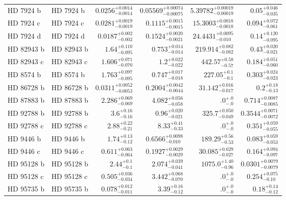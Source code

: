 \begin{longtable*}{llrrrr}
HD 7924 b & HD 7924 b & $0.0256^{+0.0014}_{-0.0014}$ & $0.05569^{+0.00074}_{-0.00075}$ & $5.39782^{+0.00019}_{-0.00019}$ & $0.05^{+0.046}_{-0.035}$ \\ 
HD 7924 c & HD 7924 c & $0.0281^{+0.0019}_{-0.0019}$ & $0.1115^{+0.0015}_{-0.0015}$ & $15.3003^{+0.0018}_{-0.0018}$ & $0.094^{+0.072}_{-0.061}$ \\ 
HD 7924 d & HD 7924 d & $0.0187^{+0.002}_{-0.002}$ & $0.1524^{+0.0020}_{-0.0021}$ & $24.4431^{+0.0095}_{-0.010}$ & $0.14^{+0.120}_{-0.095}$ \\ 
HD 82943 b & HD 82943 b & $1.64^{+0.110}_{-0.095}$ & $0.753^{+0.014}_{-0.014}$ & $219.914^{+0.082}_{-0.082}$ & $0.43^{+0.020}_{-0.021}$ \\ 
HD 82943 c & HD 82943 c & $1.606^{+0.071}_{-0.070}$ & $1.2^{+0.022}_{-0.022}$ & $442.57^{+0.58}_{-0.57}$ & $0.184^{+0.051}_{-0.060}$ \\ 
HD 8574 b & HD 8574 b & $1.763^{+0.097}_{-0.095}$ & $0.747^{+0.017}_{-0.018}$ & $227.05^{+0.1}_{-0.1}$ & $0.303^{+0.024}_{-0.023}$ \\ 
HD 86728 b & HD 86728 b & $0.0311^{+0.0052}_{-0.0053}$ & $0.2004^{+0.0042}_{-0.0044}$ & $31.142^{+0.016}_{-0.017}$ & $0.2^{+0.18}_{-0.13}$ \\ 
HD 87883 b & HD 87883 b & $2.286^{+0.069}_{-0.069}$ & $4.082^{+0.056}_{-0.058}$ & $.0^{+.0}_{-.0}$ & $0.714^{+0.0087}_{-0.0085}$ \\ 
HD 92788 b & HD 92788 b & $3.6^{+0.16}_{-0.16}$ & $0.96^{+0.020}_{-0.021}$ & $325.7^{+0.050}_{-0.049}$ & $0.3544^{+0.0071}_{-0.0072}$ \\ 
HD 92788 c & HD 92788 c & $2.88^{+0.22}_{-0.21}$ & $8.33^{+0.41}_{-0.33}$ & $.0^{+.0}_{-.0}$ & $0.351^{+0.059}_{-0.055}$ \\ 
HD 9446 b & HD 9446 b & $1.74^{+0.13}_{-0.12}$ & $0.6566^{+0.0098}_{-0.010}$ & $189.29^{+0.56}_{-0.53}$ & $0.083^{+0.059}_{-0.053}$ \\ 
HD 9446 c & HD 9446 c & $0.611^{+0.063}_{-0.064}$ & $0.1927^{+0.0029}_{-0.0029}$ & $30.085^{+0.029}_{-0.027}$ & $0.164^{+0.094}_{-0.097}$ \\ 
HD 95128 b & HD 95128 b & $2.44^{+0.1}_{-0.1}$ & $2.074^{+0.039}_{-0.041}$ & $1075.0^{+1.40}_{-0.96}$ & $0.0301^{+0.0079}_{-0.0079}$ \\ 
HD 95128 c & HD 95128 c & $0.505^{+0.036}_{-0.034}$ & $3.442^{+0.068}_{-0.070}$ & $.0^{+.0}_{-.0}$ & $0.254^{+0.075}_{-0.10}$ \\ 
HD 95735 b & HD 95735 b & $0.078^{+0.012}_{-0.011}$ & $3.39^{+0.16}_{-0.12}$ & $.0^{+.0}_{-.0}$ & $0.18^{+0.14}_{-0.12}$ \\ 

\end{longtable*}
